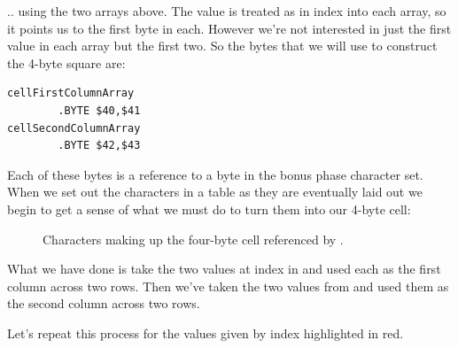 .. using the two arrays above. The value  is treated as in index into each array, so it
points us to the first byte in each. However we're not interested in just the first value in each array
but the first two. So the bytes that we will use to construct the 4-byte square are:


\begin{lstlisting}
cellFirstColumnArray
        .BYTE $40,$41
cellSecondColumnArray   
        .BYTE $42,$43
\end{lstlisting}

Each of these bytes is a reference to a byte in the bonus phase character set. When we set out the
characters in a table as they are eventually laid out we begin to get a sense of what we must do
to turn them into our 4-byte cell:

\begin{figure}[H]                          
{                                          
  \setlength{\tabcolsep}{3.0pt}            
  \setlength\cmidrulewidth{\lightrulewidth}
    \begin{adjustbox}{width=5cm,center}
\begin{subfigure}{0.12\textwidth}

\end{subfigure}
\begin{subfigure}{0.12\textwidth}

\end{subfigure}
    \end{adjustbox}
    \begin{adjustbox}{width=5cm,center}
\begin{subfigure}{0.12\textwidth}

\end{subfigure}
\begin{subfigure}{0.12\textwidth}

\end{subfigure}
    \end{adjustbox}
  }\caption[]{Characters making up the four-byte cell referenced by .}
\end{figure}

What we have done is take the two values at index  in 
and used each as the first column across two rows. Then we've taken the two values from
 and used them as the second column across two rows. 

Let's repeat this process for the values given by index  highlighted in red. 


